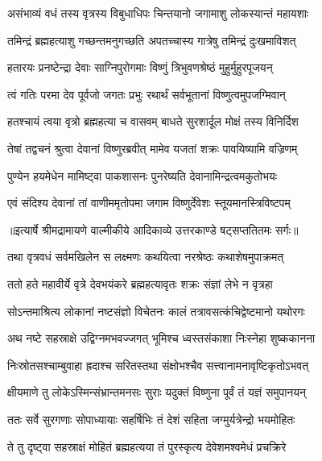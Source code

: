 \twolineshloka
{असंभाव्यं वधं तस्य वृत्रस्य विबुधाधिपः}
{चिन्तयानो जगामाशु लोकस्यान्तं महायशाः} %

\twolineshloka
{तमिन्द्रं ब्रह्महत्याशु गच्छन्तमनुगच्छति}
{अपतच्चास्य गात्रेषु तमिन्द्रं दुःखमाविशत्} %

\twolineshloka
{हतारयः प्रनष्टेन्द्रा देवाः साग्निपुरोगमाः}
{विष्णुं त्रिभुवणश्रेष्ठं मुहुर्मुहुरपूजयन्} %

\twolineshloka
{त्वं गतिः परमा देव पूर्वजो जगतः प्रभुः}
{रथार्थं सर्वभूतानां विष्णुत्वमुपजग्मिवान्} %

\twolineshloka
{हतश्चायं त्वया वृत्रो ब्रह्महत्या च वासवम्}
{बाधते सुरशार्दूल मोक्षं तस्य विनिर्दिश} %

\twolineshloka
{तेषां तद्वचनं श्रुत्वा देवानां विष्णुरब्रवीत्}
{मामेव यजतां शक्रः पावयिष्यामि वज्रिणम्} %

\twolineshloka
{पुण्येन हयमेधेन मामिष्ट्वा पाकशासनः}
{पुनरेष्यति देवानामिन्द्रत्वमकुतोभयः} %

\twolineshloka
{एवं संदिश्य देवानां तां वाणीममृतोपमा}
{जगाम विष्णुर्देवेशः स्तूयमानस्त्रिविष्टपम्} %


{॥इत्यार्षे श्रीमद्रामायणे वाल्मीकीये आदिकाव्ये उत्तरकाण्डे षट्सप्ततितमः सर्गः॥}


\twolineshloka
{तथा वृत्रवधं सर्वमखिलेन स लक्ष्मणः}
{कथयित्वा नरश्रेष्ठः कथाशेषमुपाक्रमत्} %

\twolineshloka
{ततो हते महावीर्ये वृत्रे देवभयंकरे}
{ब्रह्महत्यावृतः शक्रः संज्ञां लेभे न वृत्रहा} %

\twolineshloka
{सोऽन्तमाश्रित्य लोकानां नष्टसंज्ञो विचेतनः}
{कालं तत्रावसत्कंचिद्वेष्टमानो यथोरगः} %

\twolineshloka
{अथ नष्टे सहस्राक्षे उद्विग्नमभवज्जगत्}
{भूमिश्च ध्वस्तसंकाशा निःस्नेहा शुष्ककानना} %

\twolineshloka
{निःस्रोतसश्चाम्बुवाहा ह्रदाश्च सरितस्तथा}
{संक्षोभश्चैव सत्त्वानामनावृष्टिकृतोऽभवत्} %

\twolineshloka
{क्षीयमाणे तु लोकेऽस्मिन्संभ्रान्तमनसः सुराः}
{यदुक्तं विष्णुना पूर्वं तं यज्ञं समुपानयन्} %

\twolineshloka
{ततः सर्वे सुरगणाः सोपाध्यायाः सहर्षिभिः}
{तं देशं सहिता जग्मुर्यत्रेन्द्रो भयमोहितः} %

\twolineshloka
{ते तु दृष्ट्वा सहस्राक्षं मोहितं ब्रह्महत्यया}
{तं पुरस्कृत्य देवेशमश्वमेधं प्रचक्रिरे} %

